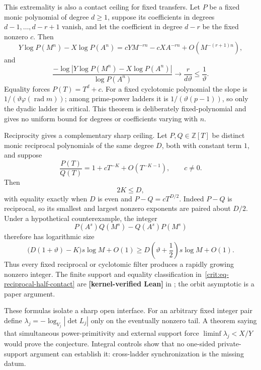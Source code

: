 \documentclass[11pt,oneside]{article}
\theoremstyle{definition}
\theoremstyle{remark}
\newcommand{\Z}{\mathbb Z}
\newcommand{\thetaq}{\vartheta}
\newcommand{\lean}[1]{\texttt{\detokenize{#1}}}
\newcommand{\statuslean}{\textcolor{leanblue}{\textbf{[kernel-verified Lean]}}}
\begin{document}
This extremality is also a contact ceiling for fixed transfers.  Let $P$ be a fixed monic
polynomial of degree $d\ge1$, suppose its coefficients in degrees
$d-1,\ldots,d-r+1$ vanish, and let the coefficient in degree $d-r$ be the fixed nonzero
$c$.  Then
\begin{equation}
 Y\log P(M^n)-X\log P(A^n)
 =cYM^{-rn}-cXA^{-rn}+O(M^{-(r+1)n}),
 \label{crit:eq-fixed-polynomial-contact}
\end{equation}
and
\begin{equation}
 \frac{-\log|Y\log P(M^n)-X\log P(A^n)|}{\log P(A^n)}
 \longrightarrow\frac{r}{d\thetaq}\le\frac1{\thetaq}.
 \label{crit:eq-fixed-polynomial-ceiling}
\end{equation}
Equality forces $P(T)=T^d+c$.  For a fixed cyclotomic polynomial the slope is
$1/(\thetaq\varphi(\operatorname{rad}m))$; among prime-power ladders it is
$1/(\thetaq(p-1))$, so only the dyadic ladder is critical.  This theorem is deliberately
fixed-polynomial and gives no uniform bound for degrees or coefficients varying with $n$.

Reciprocity gives a complementary sharp ceiling.  Let $P,Q\in\Z[T]$ be distinct monic
reciprocal polynomials of the same degree $D$, both with constant term $1$, and suppose
\[
 \frac{P(T)}{Q(T)}=1+cT^{-K}+O(T^{-K-1}),\qquad c\ne0.
\]
Then
\begin{equation}
 2K\le D,
 \label{crit:eq-reciprocal-half-contact}
\end{equation}
with equality exactly when $D$ is even and $P-Q=cT^{D/2}$.  Indeed $P-Q$ is reciprocal,
so its smallest and largest nonzero exponents are paired about $D/2$.  Under a hypothetical
counterexample, the integer
\[
 P(A^s)Q(M^s)-Q(A^s)P(M^s)
\]
therefore has logarithmic size
\begin{equation}
 \bigl(D(1+\thetaq)-K\bigr)s\log M+O(1)
 \ge D\left(\thetaq+\frac12\right)s\log M+O(1).
 \label{crit:eq-reciprocal-filter-growth}
\end{equation}
Thus every fixed reciprocal or cyclotomic filter produces a rapidly growing nonzero integer.
The finite support and equality classification in~\eqref{crit:eq-reciprocal-half-contact}
are \statuslean{} in \lean{ReciprocalHalfContact}; the orbit asymptotic is a paper argument.

These formulas isolate a sharp open interface.  For an arbitrary fixed integer pair define
$\lambda_j=-\log_{V_j}|\det L_j|$ only on the eventually nonzero tail.  A theorem saying
that simultaneous power-primitivity and external support force
$\liminf\lambda_j<X/Y$ would prove the conjecture.  Integral controls show that no
one-sided private-support argument can establish it: cross-ladder synchronization is the
missing datum.
\end{document}
